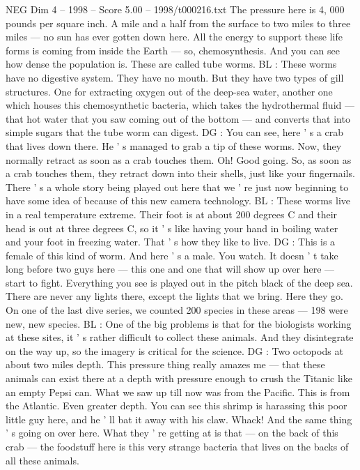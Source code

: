 \begin{textsample}{NEG Dim 4 – 1998 – Score 5.00 – 1998/t000216.txt}
The pressure here is 4, 000 pounds per square inch.
A mile and a half from the surface to two miles to three miles — no sun has ever gotten down here.
All the energy to support these life forms is coming from inside the Earth — so, chemosynthesis.
And you can see how dense the population is.
These are called tube worms.
BL : These worms have no digestive system.
They have no mouth.
But they have two types of gill structures.
One for extracting oxygen out of the deep-sea water, another one which houses this chemosynthetic bacteria, which takes the hydrothermal fluid — that hot water that you saw coming out of the bottom — and converts that into simple sugars that the tube worm can digest.
DG : You can see, here ' s a crab that lives down there.
He ' s managed to grab a tip of these worms.
Now, they normally retract as soon as a crab touches them.
Oh!
Good going.
So, as soon as a crab touches them, they retract down into their shells, just like your fingernails.
There ' s a whole story being played out here that we ' re just now beginning to have some idea of because of this new camera technology.
BL : These worms live in a real temperature extreme.
Their foot is at about 200 degrees C and their head is out at three degrees C, so it ' s like having your hand in boiling water and your foot in freezing water.
That ' s how they like to live.
DG : This is a female of this kind of worm.
And here ' s a male.
You watch.
It doesn ' t take long before two guys here — this one and one that will show up over here — start to fight.
Everything you see is played out in the pitch black of the deep sea.
There are never any lights there, except the lights that we bring.
Here they go.
On one of the last dive series, we counted 200 species in these areas — 198 were new, new species.
BL : One of the big problems is that for the biologists working at these sites, it ' s rather difficult to collect these animals.
And they disintegrate on the way up, so the imagery is critical for the science.
DG : Two octopods at about two miles depth.
This pressure thing really amazes me — that these animals can exist there at a depth with pressure enough to crush the Titanic like an empty Pepsi can.
What we saw up till now was from the Pacific.
This is from the Atlantic.
Even greater depth.
You can see this shrimp is harassing this poor little guy here, and he ' ll bat it away with his claw.
Whack!
And the same thing ' s going on over here.
What they ' re getting at is that — on the back of this crab — the foodstuff here is this very strange bacteria that lives on the backs of all these animals.

\end{textsample}

